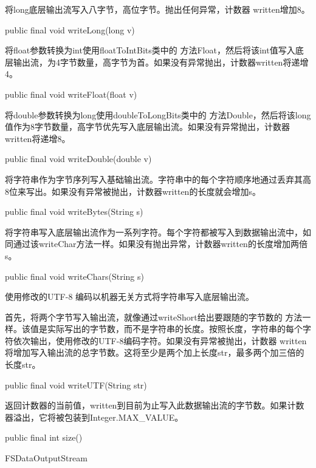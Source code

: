 将long底层输出流写入八字节，高位字节。抛出任何异常，计数器 written增加8。
\begin{java}
public final void writeLong(long v)
\end{java}
将float参数转换为int使用floatToIntBits类中的 方法Float，然后将该int值写入底层输出流，为4字节数量，高字节为首。如果没有异常抛出，计数器written将递增4。

\begin{java}
public final void writeFloat(float v)
\end{java}

将double参数转换为long使用doubleToLongBits类中的 方法Double，然后将该long值作为8字节数量，高字节优先写入底层输出流。如果没有异常抛出，计数器written将递增8。

\begin{java}
public final void writeDouble(double v)
\end{java}

将字符串作为字节序列写入基础输出流。字符串中的每个字符顺序地通过丢弃其高8位来写出。如果没有异常被抛出，计数器written的长度就会增加s。
\begin{java}
public final void writeBytes(String  s)
\end{java}

将字符串写入底层输出流作为一系列字符。每个字符都被写入到数据输出流中，如同通过该writeChar方法一样。如果没有抛出异常，计数器written的长度增加两倍s。
\begin{java}
public final void writeChars(String  s)
\end{java}

使用修改的UTF-8 编码以机器无关方式将字符串写入底层输出流。

首先，将两个字节写入输出流，就像通过writeShort给出要跟随的字节数的 方法一样。该值是实际写出的字节数，而不是字符串的长度。按照长度，字符串的每个字符依次输出，使用修改的UTF-8编码字符。如果没有异常被抛出，计数器 written将增加写入输出流的总字节数。这将至少是两个加上长度str，最多两个加三倍的长度str。


\begin{java}
public final void writeUTF(String str)
\end{java}

返回计数器的当前值，written到目前为止写入此数据输出流的字节数。如果计数器溢出，它将被包装到Integer.MAX\_VALUE。
\begin{java}
public final int size()
\end{java}

FSDataOutputStream

